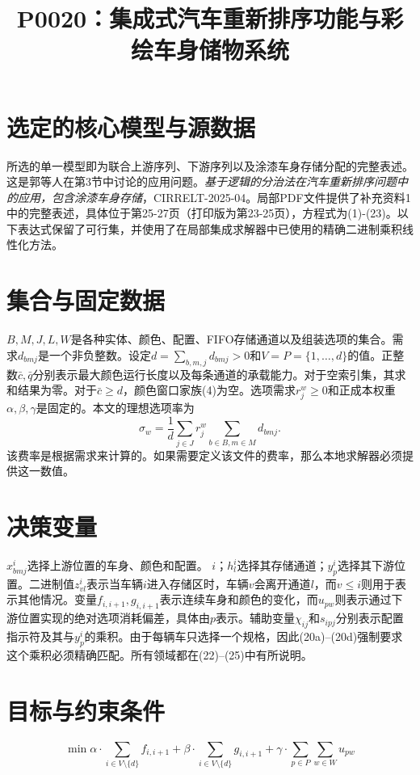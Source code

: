 \documentclass[10pt,a4paper]{article}
\title{P0020：集成式汽车重新排序功能与彩绘车身储物系统}
\date{}
\begin{document}
\maketitle

\section*{选定的核心模型与源数据}
所选的单一模型即为联合上游序列、下游序列以及涂漆车身存储分配的完整表述。这是郭等人在第3节中讨论的应用问题。\emph{基于逻辑的分治法在汽车重新排序问题中的应用，包含涂漆车身存储}，CIRRELT-2025-04。局部PDF文件提供了补充资料1中的完整表述，具体位于第25-27页（打印版为第23-25页），方程式为(1)-(23)。以下表达式保留了可行集，并使用了在局部集成求解器中已使用的精确二进制乘积线性化方法。


\section*{集合与固定数据}
$B,M,J,L,W$是各种实体、颜色、配置、FIFO存储通道以及组装选项的集合。需求$d_{bmj}$是一个非负整数。设定$d=\sum_{b,m,j}d_{bmj}>0$和$V=P=\{1,\ldots,d\}$的值。正整数$\bar c,\bar q$分别表示最大颜色运行长度以及每条通道的承载能力。对于空索引集，其求和结果为零。对于$\bar c\ge d$，颜色窗口家族(4)为空。选项需求$r_j^w\ge0$和正成本权重$\alpha,\beta,\gamma$是固定的。本文的理想选项率为
\[
 \sigma_w=\frac{1}{d}\sum_{j\in J}r_j^w
                  \sum_{b\in B,m\in M}d_{bmj}.
\]
该费率是根据需求来计算的。如果需要定义该文件的费率，那么本地求解器必须提供这一数值。

\section*{决策变量}
$x_{bmj}^i$选择上游位置的车身、颜色和配置。  
$i$；$h_l^i$选择其存储通道；$y_p^i$选择其下游位置。二进制值$z_{vl}^i$表示当车辆$i$进入存储区时，车辆$v$会离开通道$l$，而$v\le i$则用于表示其他情况。变量$f_{i,i+1},g_{i,i+1}$表示连续车身和颜色的变化，而$u_{pw}$则表示通过下游位置实现的绝对选项消耗偏差，具体由$p$表示。辅助变量$\chi_{ij}$和$s_{ipj}$分别表示配置指示符及其与$y_p^i$的乘积。由于每辆车只选择一个规格，因此(20a)--(20d)强制要求这个乘积必须精确匹配。所有领域都在(22)--(25)中有所说明。

\section*{目标与约束条件}

\begin{equation}
\min
\alpha \cdot \sum_{i \in V \setminus \{d\}} f_{i,i+1}
+ \beta \cdot \sum_{i \in V \setminus \{d\}} g_{i,i+1}
+ \gamma \cdot \sum_{p \in P} \sum_{w \in W} u_{pw}
\tag{1}
\end{equation}
\end{document}
